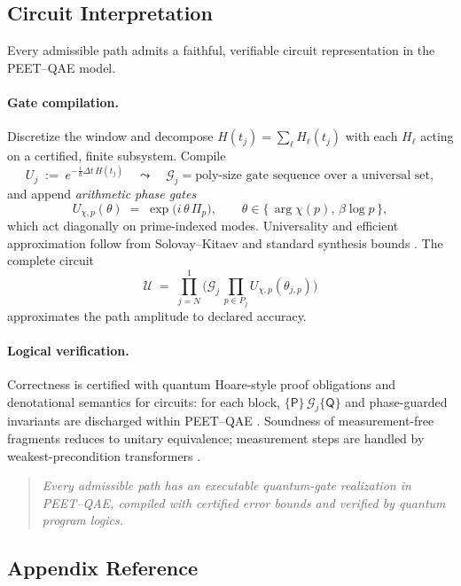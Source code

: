 \documentclass[12pt]{amsart}
\theoremstyle{plain}
\begin{document}
\subsection{Circuit Interpretation}

Every admissible path admits a faithful, verifiable circuit representation in the PEET–QAE model.

\paragraph{Gate compilation.}
Discretize the window and decompose $H(t_j)=\sum_{\ell}H_\ell(t_j)$ with each $H_\ell$ acting on a certified, finite subsystem. Compile
\[
U_j\;:=\;e^{-\tfrac{i}{\hbar}\Delta t\,H(t_j)}
\quad\leadsto\quad
\mathcal{G}_j=\text{poly-size gate sequence over a universal set},
\]
and append \emph{arithmetic phase gates}
\[
U_{\chi,p}(\theta)\;=\;\exp\!\big(i\,\theta\,\Pi_p\big),\qquad \theta\in\{\,\arg\chi(p),\,\beta\log p\,\},
\]
which act diagonally on prime-indexed modes. Universality and efficient approximation follow from Solovay–Kitaev and standard synthesis bounds \cite{nielsen2010quantum,dawson2005solovay}. The complete circuit
\[
\mathcal{U}\;=\;\prod_{j=N}^{1}\Big(\mathcal{G}_j\,\prod_{p\in P_j}U_{\chi,p}(\theta_{j,p})\Big)
\]
approximates the path amplitude to declared accuracy.

\paragraph{Logical verification.}
Correctness is certified with quantum Hoare-style proof obligations and denotational semantics for circuits: for each block, $\{\mathsf{P}\}\,\mathcal{G}_j\{\mathsf{Q}\}$ and phase-guarded invariants are discharged within PEET–QAE \cite{dhondt2006logic,ying2016foundations,selinger2004survey}. Soundness of measurement-free fragments reduces to unitary equivalence; measurement steps are handled by weakest-precondition transformers \cite{ying2016foundations}.

\begin{quote}
\textit{Every admissible path has an executable quantum-gate realization in PEET–QAE, compiled with certified error bounds and verified by quantum program logics.}
\end{quote}

\subsection*{Appendix Reference}
\end{document}
